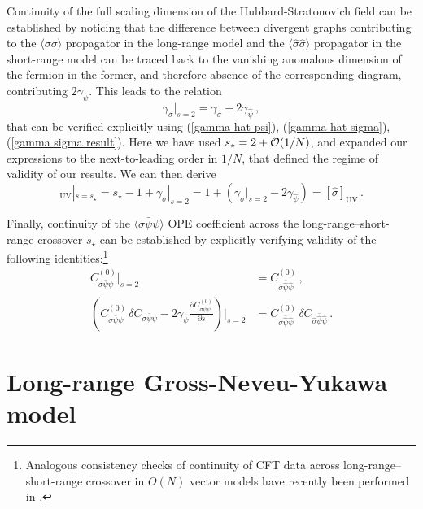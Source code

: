 \documentclass[aps,amsmath,amssymb,prd,showpacs,floatfix,preprint,superscriptaddress,nofootinbib,12pt]{article}
\begin{document}
Continuity of the full scaling dimension of the Hubbard-Stratonovich field
can be established by noticing that the difference between divergent graphs
contributing to the $\langle \sigma\sigma\rangle$ propagator in the long-range
model and the $\langle \hat\sigma\hat\sigma\rangle$ propagator in the short-range
model can be traced back to the vanishing anomalous dimension of the fermion in the former,
and therefore absence of the corresponding diagram, contributing $2\gamma_{\hat \psi}$.
This leads to the relation
\begin{equation}
\gamma_\sigma|_{s=2} =\gamma_{\hat\sigma}+ 2\gamma_{\hat \psi}\,,
\end{equation}
that can be verified explicitly using (\ref{gamma hat psi}), (\ref{gamma hat sigma}), (\ref{gamma sigma result}).
Here we have used $s_\star = 2 +{\cal O}(1/N)$, and expanded our expressions
to the next-to-leading order in $1/N$, that defined the regime of validity of our results.
We can then derive
\begin{equation}
[\sigma]_{\textrm{UV}}|_{s=s_\star} = s_\star -1+\gamma_\sigma|_{s=2} = 1 + (\gamma_\sigma|_{s=2}-2\gamma_{\hat \psi})
=[\hat\sigma]_{\textrm{UV}}\,.
\end{equation}


Finally, continuity of the $\langle\sigma\bar\psi\psi\rangle$ OPE coefficient
across the long-range--short-range crossover $s_\star$ can be established by
explicitly verifying validity of the following identities:\footnote{Analogous
consistency checks of continuity of CFT data across long-range--short-range
crossover in $O(N)$ vector models have recently been performed in \cite{Chai:2021arp}.}
\begin{equation}
\begin{aligned}
C_{\sigma\bar\psi\psi}^{(0)}|_{s=2} &= C_{\hat\sigma\bar{\hat\psi}\hat\psi}^{(0)} \,,\\
\left(C_{\sigma\bar\psi\psi}^{(0)}\,\delta C_{\sigma\bar\psi\psi}
-2\gamma_{\hat\psi}\frac{\partial C_{\sigma\bar\psi\psi}^{(0)}}{\partial s}\right)|_{s=2}
&=C_{\hat\sigma\bar{\hat\psi}\hat\psi}^{(0)}\,\delta C_{\hat\sigma\bar{\hat\psi}\hat\psi}\,.
\end{aligned}
\end{equation}


\section{Long-range Gross-Neveu-Yukawa model}
\label{sec: LR GNY}
\end{document}
